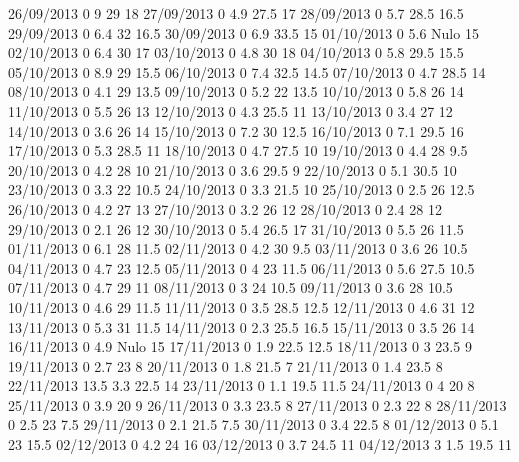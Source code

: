 26/09/2013  0      9      29     18 
27/09/2013  0      4.9    27.5   17 
28/09/2013  0      5.7    28.5   16.5 
29/09/2013  0      6.4    32     16.5 
30/09/2013  0      6.9    33.5   15 
01/10/2013  0      5.6   Nulo    15 
02/10/2013  0      6.4    30     17 
03/10/2013  0      4.8    30     18 
04/10/2013  0      5.8    29.5   15.5 
05/10/2013  0      8.9    29     15.5 
06/10/2013  0      7.4    32.5   14.5 
07/10/2013  0      4.7    28.5   14 
08/10/2013  0      4.1    29     13.5 
09/10/2013  0      5.2    22     13.5 
10/10/2013  0      5.8    26     14 
11/10/2013  0      5.5    26     13 
12/10/2013  0      4.3    25.5   11 
13/10/2013  0      3.4    27     12 
14/10/2013  0      3.6    26     14 
15/10/2013  0      7.2    30     12.5 
16/10/2013  0      7.1    29.5   16 
17/10/2013  0      5.3    28.5   11 
18/10/2013  0      4.7    27.5   10 
19/10/2013  0      4.4    28     9.5 
20/10/2013  0      4.2    28     10 
21/10/2013  0      3.6    29.5   9 
22/10/2013  0      5.1    30.5   10 
23/10/2013  0      3.3    22     10.5 
24/10/2013  0      3.3    21.5   10 
25/10/2013  0      2.5    26     12.5 
26/10/2013  0      4.2    27     13 
27/10/2013  0      3.2    26     12 
28/10/2013  0      2.4    28     12 
29/10/2013  0      2.1    26     12 
30/10/2013  0      5.4    26.5   17 
31/10/2013  0      5.5    26     11.5 
01/11/2013  0      6.1    28     11.5 
02/11/2013  0      4.2    30     9.5 
03/11/2013  0      3.6    26     10.5 
04/11/2013  0      4.7    23     12.5 
05/11/2013  0      4      23     11.5 
06/11/2013  0      5.6    27.5   10.5 
07/11/2013  0      4.7    29     11 
08/11/2013  0      3      24     10.5 
09/11/2013  0      3.6    28     10.5 
10/11/2013  0      4.6    29     11.5 
11/11/2013  0      3.5    28.5   12.5 
12/11/2013  0      4.6    31     12 
13/11/2013  0      5.3    31     11.5 
14/11/2013  0      2.3    25.5   16.5 
15/11/2013  0      3.5    26     14 
16/11/2013  0      4.9   Nulo    15 
17/11/2013  0      1.9    22.5   12.5 
18/11/2013  0      3      23.5   9 
19/11/2013  0      2.7    23     8 
20/11/2013  0      1.8    21.5   7 
21/11/2013  0      1.4    23.5   8 
22/11/2013  13.5   3.3    22.5   14 
23/11/2013  0      1.1    19.5   11.5 
24/11/2013  0      4      20     8 
25/11/2013  0      3.9    20     9 
26/11/2013  0      3.3    23.5   8 
27/11/2013  0      2.3    22     8 
28/11/2013  0      2.5    23     7.5 
29/11/2013  0      2.1    21.5   7.5 
30/11/2013  0      3.4    22.5   8 
01/12/2013  0      5.1    23     15.5 
02/12/2013  0      4.2    24     16 
03/12/2013  0      3.7    24.5   11 
04/12/2013  3      1.5    19.5   11 
